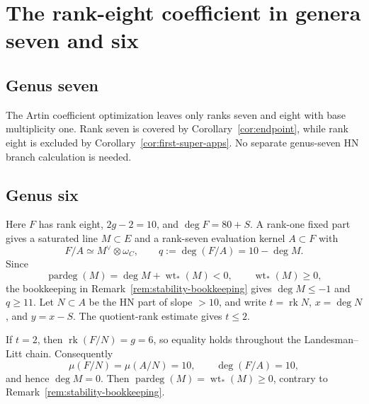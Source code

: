 \documentclass[11pt]{article}
\theoremstyle{definition}
\newcommand{\rk}{\operatorname{rk}}
\newcommand{\degp}{\operatorname{pardeg}}
\begin{document}
\section{The rank-eight coefficient in genera seven and six}\label{sec:rank8-g76}

\subsection{Genus seven}

The Artin coefficient optimization leaves only ranks seven and eight with
base multiplicity one.  Rank seven is covered by
Corollary~\ref{cor:endpoint}, while rank eight is excluded by
Corollary~\ref{cor:first-super-apps}.  No separate genus-seven HN branch
calculation is needed.

\subsection{Genus six}

Here $F$ has rank eight, $2g-2=10$, and $\deg F=80+S$.  A rank-one fixed
part gives a saturated line $M\subset E$ and a rank-seven evaluation kernel
$A\subset F$ with
\[
 F/A\simeq M^\vee\otimes\omega_C,
 \qquad q:=\deg(F/A)=10-\deg M.
\]
Since
\[
 \degp(M)=\deg M+\operatorname{wt}_*(M)<0,
 \qquad \operatorname{wt}_*(M)\ge0,
\]
the bookkeeping in Remark~\ref{rem:stability-bookkeeping} gives $\deg M\le-1$ and
$q\ge11$.
Let $N\subset A$ be the HN part of slope $>10$, and write
$t=\rk N$, $x=\deg N$, and $y=x-S$.  The quotient-rank estimate gives
$t\le2$.

If $t=2$, then $\rk(F/N)=g=6$, so equality holds throughout the
Landesman--Litt chain.  Consequently
\[
 \mu(F/N)=\mu(A/N)=10,
 \qquad \deg(F/A)=10,
\]
and hence $\deg M=0$.  Then
$\degp(M)=\operatorname{wt}_*(M)\ge0$, contrary to
Remark~\ref{rem:stability-bookkeeping}.
\end{document}
